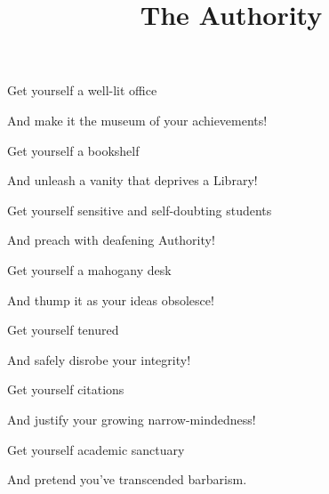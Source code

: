 \documentclass{article}
\title{The Authority}
\begin{document}
 \newline

Get yourself a well-lit office \newline

And make it the museum of your achievements!\newline\newline

Get yourself a bookshelf\newline

And unleash a vanity that deprives a Library!\newline\newline

Get yourself sensitive and self-doubting students\newline

And preach with deafening Authority!\newline\newline

Get yourself a mahogany desk\newline

And thump it as your ideas obsolesce!\newline\newline

Get yourself tenured\newline

And safely disrobe your integrity!\newline\newline

Get yourself citations\newline

And justify your growing narrow-mindedness!\newline\newline

Get yourself academic sanctuary\newline

And pretend you've transcended barbarism.\newline\newline
\end{document}
